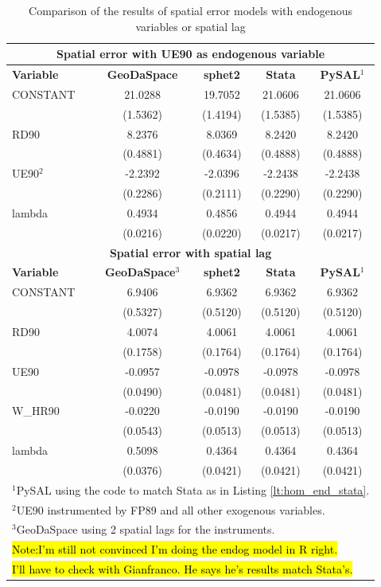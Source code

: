 \documentclass{article}
\begin{document}
\begin{table}[htpb]
\caption{Comparison of the results of spatial error models with endogenous variables or spatial lag}
\label{t:res_hom_endog}
\centering
\begin{small}
\begin{tabular}{l|cccc} \hline
\multicolumn{5}{c}{\textbf{Spatial error with UE90 as endogenous variable}} \\ \hline
\textbf{Variable}&\textbf{GeoDaSpace}&\textbf{sphet2}&\textbf{Stata}&\textbf{PySAL$^1$}\\ \hline
CONSTANT&21.0288&19.7052&21.0606&21.0606\\
&(1.5362)&(1.4194)&(1.5385)&(1.5385)\\
RD90&8.2376&8.0369&8.2420&8.2420\\
&(0.4881)&(0.4634)&(0.4888)&(0.4888)\\
UE90$^2$&-2.2392&-2.0396&-2.2438&-2.2438\\
&(0.2286)&(0.2111)&(0.2290)&(0.2290)\\
lambda&0.4934&0.4856&0.4944&0.4944\\
&(0.0216)&(0.0220)&(0.0217)&(0.0217)\\
\hline
\multicolumn{5}{c}{\textbf{Spatial error with spatial lag}} \\ \hline
\textbf{Variable}&\textbf{GeoDaSpace$^3$}&\textbf{sphet2}&\textbf{Stata}&\textbf{PySAL$^1$}\\ \hline
CONSTANT&6.9406&6.9362&6.9362&6.9362\\
&(0.5327)&(0.5120)&(0.5120)&(0.5120)\\
RD90&4.0074&4.0061&4.0061&4.0061\\
&(0.1758)&(0.1764)&(0.1764)&(0.1764)\\
UE90&-0.0957&-0.0978&-0.0978&-0.0978\\
&(0.0490)&(0.0481)&(0.0481)&(0.0481)\\
W\_HR90&-0.0220&-0.0190&-0.0190&-0.0190\\
&(0.0543)&(0.0513)&(0.0513)&(0.0513)\\
lambda&0.5098&0.4364&0.4364&0.4364\\
&(0.0376)&(0.0421)&(0.0421)&(0.0421)\\
\hline
\multicolumn{5}{l}{\scriptsize{$^1$PySAL using the code to match Stata as in Listing \ref{lt:hom_end_stata}.}} \\
\multicolumn{5}{l}{\scriptsize{$^2$UE90 instrumented by FP89 and all other exogenous variables.}} \\
\multicolumn{5}{l}{\scriptsize{$^3$GeoDaSpace using 2 spatial lags for the instruments.}} \\
\multicolumn{5}{l}{\scriptsize{\hl{Note:I'm still not convinced I'm doing the endog model in R right.}}} \\
\multicolumn{5}{l}{\scriptsize{\hl{I'll have to check with Gianfranco. He says he's results match Stata's.}}} \\
\end{tabular}
\end{small}
\end{table}
\end{document}
